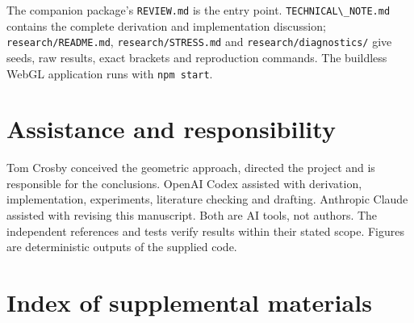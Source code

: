 \documentclass{jcgt}
\providecommand{\passthrough}[1]{#1}
\begin{document}
The companion package's \passthrough{\lstinline!REVIEW.md!} is the entry
point. \passthrough{\lstinline!TECHNICAL\_NOTE.md!} contains the
complete derivation and implementation discussion;
\passthrough{\lstinline!research/README.md!},
\passthrough{\lstinline!research/STRESS.md!} and
\passthrough{\lstinline!research/diagnostics/!} give seeds, raw results,
exact brackets and reproduction commands. The buildless WebGL
application runs with \passthrough{\lstinline!npm start!}.

\section*{Assistance and
responsibility}\label{assistance-and-responsibility}

Tom Crosby conceived the geometric approach, directed the project and is
responsible for the conclusions. OpenAI Codex assisted with derivation,
implementation, experiments, literature checking and drafting. Anthropic
Claude assisted with revising this manuscript. Both are AI tools, not
authors. The independent references and tests verify results within
their stated scope. Figures are deterministic outputs of the supplied
code.

\small


\section*{Index of supplemental
materials}\label{index-of-supplemental-materials}
\end{document}
